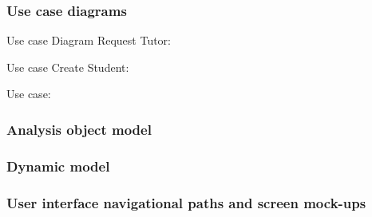 \documentclass[12pt]{article}
\begin{document}
{		

	\newpage	
\subsubsection{Use case diagrams}
Use case Diagram Request Tutor:

Use case Create Student:

\newpage
Use case:

		
\newpage
\subsubsection{Analysis object model}
\subsubsection{Dynamic model}
	
\subsubsection{User interface navigational paths and screen mock-ups} 
}
\end{document}
